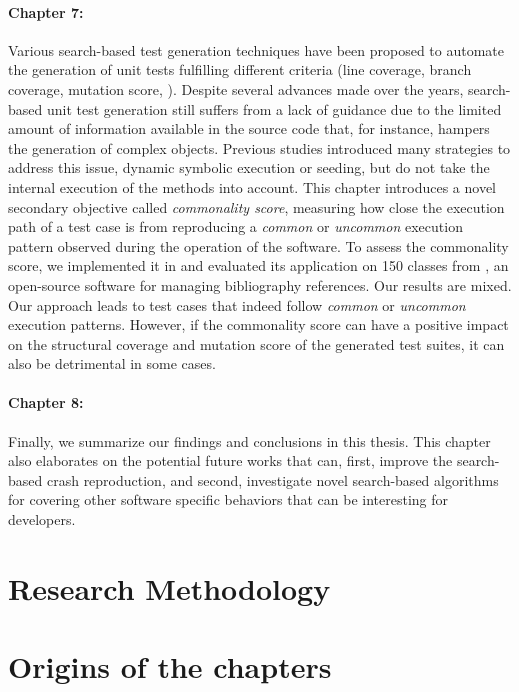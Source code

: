 \paragraph{Chapter 7:}%
Various search-based test generation techniques have been proposed to automate the generation of unit tests fulfilling different criteria (\eg line coverage, branch coverage, mutation score, \etc). Despite several advances made over the years, search-based unit test generation still suffers from a lack of guidance due to the limited amount of information available in the source code that, for instance, hampers the generation of complex objects. Previous studies introduced many strategies to address this issue, \eg dynamic symbolic execution or seeding, but do not take the internal execution of the methods into account.  
This chapter introduces a novel secondary objective called \emph{commonality score}, measuring how close the execution path of a test case is from reproducing a \emph{common} or \emph{uncommon} execution pattern observed during the operation of the software.
To assess the commonality score, we implemented it in \evosuite and evaluated its application on 150 classes from \jabref, an open-source software for managing bibliography references. 
Our results are mixed. Our approach leads to test cases that indeed follow \emph{common} or \emph{uncommon} execution patterns. However, if the commonality score can have a positive impact on the structural coverage and mutation score of the generated test suites, it can also be detrimental in some cases. 

\paragraph{Chapter 8:} 
Finally, we summarize our findings and conclusions in this thesis. This chapter also elaborates on the potential future works that can, first, improve the search-based crash reproduction, and second, investigate novel search-based algorithms for covering other software specific behaviors that can be interesting for developers.


\section{Research Methodology}




\section{Origins of the chapters}


